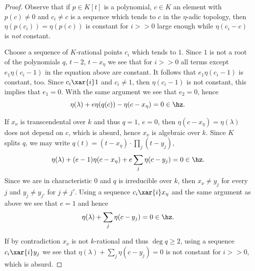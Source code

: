 \begin{proposition}
\begin{proof}
		Observe that if $p\in K[t]$ is a polynomial, $c\in K$ an element with $p(c)\neq 0$ and $c_{i}\neq c$ is a sequence which tends to $c$ in the $\eta$-adic topology, then $\eta(p(c_{i}))=\eta(p(c))$ is constant for $i>>0$ large enough while $\eta(c_{i}-c)$ is \emph{not} constant.

		Choose a sequence of $K$-rational points $c_{i}$ which tends to $1$. Since $1$ is not a root of the polynomials $q$, $t-2$, $t-x_{\eta}$ we see that for $i>>0$ all terms except $e_{1}\eta(c_{i}-1)$ in the equation above are constant. It follows that $e_{1}\eta(c_{i}-1)$ is constant, too. Since $c_{i}\xar{i} 1$ and $c_{i}\neq 1$, then $\eta(c_{i}-1)$ is not constant, this implies that $e_{1}=0$. With the same argument we see that $e_{2}=0$, hence
		\[\eta(\lambda)+e\eta(q(c))-\eta(c-x_{\eta})=0\in\hz.\]

		If $x_{\nu}$ is transcendental over $k$ and thus $q=1$, $e=0$, then $\eta(c-x_{\eta})=\eta(\lambda)$ does not depend on $c$, which is absurd, hence $x_{\nu}$ is algebraic over $k$. Since $K$ splits $q$, we may write $q(t)=(t-x_{\eta})\cdot\prod_{j}(t-y_{j})$,
		\[\eta(\lambda)+(e-1)\eta(c-x_{\eta})+e\sum_{j}\eta(c-y_{j})=0\in\hz.\]
		Since we are in characteristic $0$ and $q$ is irreducible over $k$, then $x_{\nu}\neq y_{j}$ for every $j$ and $y_{j}\neq y_{j'}$ for $j\neq j'$. Using a sequence $c_{i}\xar{i}x_{\eta}$ and the same argument as above we see that $e=1$ and hence
		\[\eta(\lambda)+\sum_{j}\eta(c-y_{j})=0\in\hz.\]

		If by contradiction $x_{\nu}$ is not $k$-rational and thus $\deg q\ge 2$, using a sequence $c_{i}\xar{i}y_{j}$ we see that $\eta(\lambda)+\sum_{j}\eta(c-y_{j})=0$ is not constant for $i>>0$, which is absurd.
	\end{proof}
\end{proposition}








